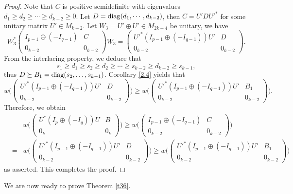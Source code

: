 \documentclass[11pt]{article}
\numberwithin{equation}{section}
\def\diag{{\rm diag}}
\begin{document}
\begin{proof}
Note that $C$ is positive semidefinite with eigenvalues $d_1\ge d_2\ge\cdots\ge d_{k-2}\ge 0$. Let  $D=\diag(d_1, \cdots, d_{k-2})$, then $C=U'D{U'}^*$ for some unitary matrix $U'\in M_{k-2}$. Let $W_3=U'\oplus U'\in M_{2k-4}$ be unitary, we have
$$W_3^*\begin{pmatrix} I_{p-1}\oplus (-I_{q-1}) & C \\ 0_{k-2} & 0_{k-2}\end{pmatrix}W_3=\begin{pmatrix} {U'}^*(I_{p-1}\oplus (-I_{q-1}))U' & D \\ 0_{k-2} & 0_{k-2}\end{pmatrix}.$$ From the interlacing property, we deduce that
$$s_1\ge d_1\ge s_2\ge d_2\ge \cdots\ge s_{k-2}\ge d_{k-2}\ge s_{k-1},$$
thus $D \succeq B_1=\diag(s_2, \dots, s_{k-1})$.  Corollary \ref{2.4} yields that
$$w\Big(\begin{pmatrix} {U'}^*(I_{p-1}\oplus (-I_{q-1}))U' & D \\ 0_{k-2} & 0_{k-2}\end{pmatrix}\Big) \ge w\Big(\begin{pmatrix} {U'}^*(I_{p-1}\oplus (-I_{q-1}))U' & B_1 \\ 0_{k-2} & 0_{k-2}\end{pmatrix}\Big).$$
Therefore, we obtain
\begin{eqnarray*}
& & w\Big(\begin{pmatrix} U^*(I_p\oplus(-I_q))U & B\\ 0_k & 0_k\end{pmatrix}\Big)
\ge w\Big(\begin{pmatrix} I_{p-1}\oplus (-I_{q-1}) & C \\ 0_{k-2} & 0_{k-2}\end{pmatrix}\Big) \\
&=& w\Big(\begin{pmatrix} {U'}^*(I_{p-1}\oplus (-I_{q-1}))U' & D \\ 0_{k-2} & 0_{k-2}\end{pmatrix}\Big)
\ge w\Big(\begin{pmatrix} {U'}^*(I_{p-1}\oplus (-I_{q-1}))U' & B_1\\ 0_{k-2} & 0_{k-2}\end{pmatrix}\Big)\end{eqnarray*}
as asserted. This completes the proof.
\end{proof}

We are now ready to prove Theorem \ref{t36}.
\end{document}
